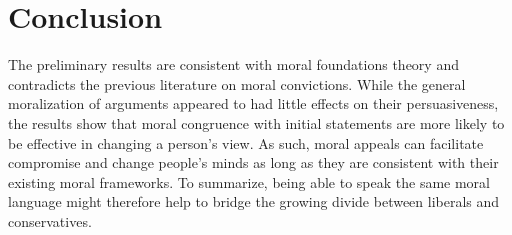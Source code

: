 
\section{Conclusion}\label{conclusion}

The preliminary results are consistent with moral foundations theory and contradicts the previous literature on moral convictions. While the general moralization of arguments appeared to had little effects on their persuasiveness, the results show that moral congruence with initial statements are more likely to be effective in changing a person's view. As such, moral appeals can facilitate compromise and change people's minds as long as they are consistent with their existing moral frameworks. To summarize, being able to speak the same moral language might therefore help to bridge the growing divide between liberals and conservatives.



